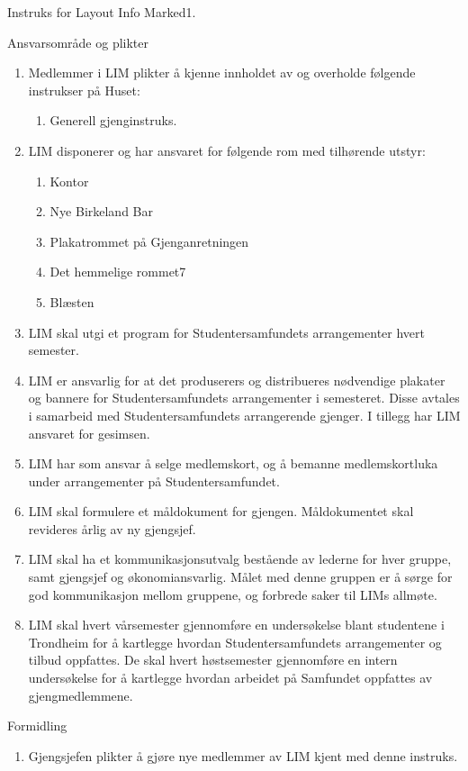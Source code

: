 \begin{instruks}{Instruks for Layout Info Marked}{1. }{ }
     \begin{instruksledd}{Ansvarsområde og plikter}
        \begin{enumerate}   
            \item  Medlemmer i LIM plikter å kjenne innholdet av og overholde følgende instrukser på
Huset:
                \begin{enumerate}
                    \item Generell gjenginstruks.
                \end{enumerate}
            \item LIM disponerer og har ansvaret for følgende rom med tilhørende utstyr:
                \begin{enumerate}
                    \item Kontor
                    \item Nye Birkeland Bar
                    \item Plakatrommet på Gjenganretningen
                    \item Det hemmelige rommet7
                    \item Blæsten
                \end{enumerate}
		\item LIM skal utgi et program for
Studentersamfundets arrangementer hvert semester.
		\item LIM er ansvarlig for at det
produserers og distribueres nødvendige plakater og bannere for
		Studentersamfundets
arrangementer i semesteret. Disse avtales i samarbeid med Studentersamfundets
		arrangerende
gjenger. I tillegg har LIM ansvaret for gesimsen.
		\item LIM har som ansvar å selge medlemskort, og å
bemanne medlemskortluka under arrangementer på Studentersamfundet.
		\item LIM skal formulere et måldokument for
gjengen. Måldokumentet skal revideres årlig av ny gjengsjef.
		\item LIM skal ha et kommunikasjonsutvalg
bestående av lederne for hver gruppe, samt gjengsjef og
økonomiansvarlig. Målet med denne gruppen er å sørge for god kommunikasjon mellom gruppene, og
forbrede saker til LIMs allmøte.
		\item LIM skal hvert vårsemester gjennomføre en
undersøkelse blant studentene i Trondheim for å kartlegge
hvordan Studentersamfundets arrangementer og tilbud oppfattes. De skal hvert høstsemester
gjennomføre en
intern undersøkelse for å kartlegge hvordan arbeidet på Samfundet oppfattes av gjengmedlemmene.
        \end{enumerate}
    \end{instruksledd}
        
		\begin{instruksledd}{Formidling}
        \begin{enumerate}
            \item Gjengsjefen plikter å gjøre nye medlemmer av LIM kjent med denne instruks.
        \end{enumerate}
    \end{instruksledd}


\end{instruks}